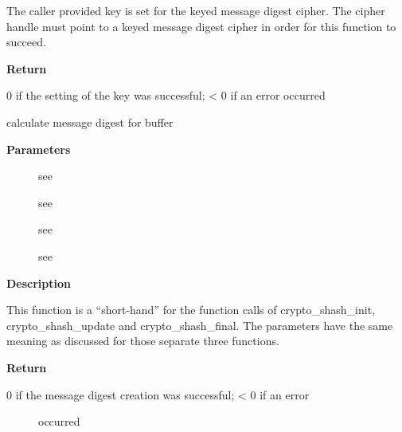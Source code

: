 \documentclass[a4paper,8pt,english]{sphinxmanual}
\begin{document}
The caller provided key is set for the keyed message digest cipher. The
cipher handle must point to a keyed message digest cipher in order for this
function to succeed.

\textbf{Return}

0 if the setting of the key was successful; \textless{} 0 if an error occurred

\begin{fulllineitems}
\label{crypto/api-digest:c.crypto_shash_digest}
calculate message digest for buffer

\end{fulllineitems}


\textbf{Parameters}
\begin{description}
\item[{}] \leavevmode
see {\hyperref[crypto/api\string-digest:c.crypto_shash_final]{}}

\item[{}] \leavevmode
see {\hyperref[crypto/api\string-digest:c.crypto_shash_update]{}}

\item[{}] \leavevmode
see {\hyperref[crypto/api\string-digest:c.crypto_shash_update]{}}

\item[{}] \leavevmode
see {\hyperref[crypto/api\string-digest:c.crypto_shash_final]{}}

\end{description}

\textbf{Description}

This function is a ``short-hand'' for the function calls of crypto\_shash\_init,
crypto\_shash\_update and crypto\_shash\_final. The parameters have the same
meaning as discussed for those separate three functions.

\textbf{Return}
\begin{description}
\item[{0 if the message digest creation was successful; \textless{} 0 if an error}] \leavevmode
occurred

\end{description}
\end{document}
